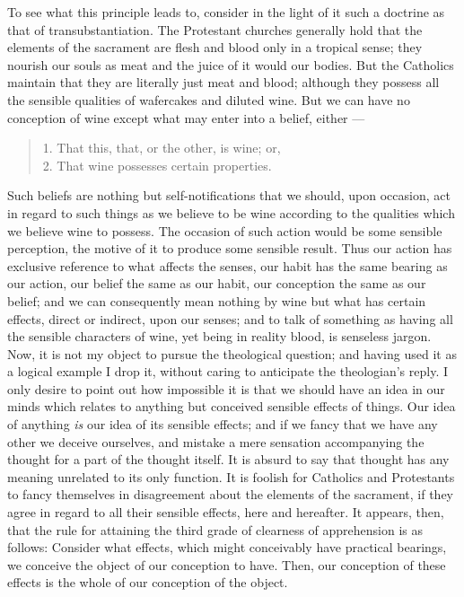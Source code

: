 To see what this principle leads to, consider in the light of it such a doctrine as that of transubstantiation. The Protestant churches generally hold that the elements of the sacrament are flesh and blood only in a tropical sense; they nourish our souls as meat and the juice of it would our bodies. But the Catholics maintain that they are literally just meat and blood; although they possess all the sensible qualities of wafercakes and diluted wine. But we can have no conception of wine except what may enter into a belief, either ---
\begin{quote}
1. That this, that, or the other, is wine; or,\\
2. That wine possesses certain properties.
\end{quote}

Such beliefs are nothing but self-notifications that we should, upon occasion, act in regard to such things as we believe to be wine according to the qualities which we believe wine to possess. The occasion  of such action would be some sensible perception, the motive of it to produce some sensible result. Thus our action has exclusive reference to what affects the senses, our habit has the same bearing as our action, our belief the same as our habit, our conception the same as our belief; and we can consequently mean nothing by wine but what has certain effects, direct or indirect, upon our senses; and to talk of something as having all the sensible characters of wine, yet being in reality blood, is senseless jargon. Now, it is not my object to pursue the theological question; and having used it as a logical example I drop it, without caring to anticipate the theologian's reply. I only desire to point out how impossible it is that we should have an idea in our minds which relates to anything but conceived sensible effects of things. Our idea of anything \emph{is} our idea of its sensible effects; and if we fancy that we have any other we deceive ourselves, and mistake a mere sensation accompanying the thought for a part of the thought itself. It is absurd to say that thought has any meaning unrelated to its only function. It is foolish for Catholics and Protestants to fancy themselves in disagreement about the elements of the sacrament, if they agree in regard to all their sensible effects, here and hereafter.
It appears, then, that the rule for attaining the third grade of clearness of apprehension is as follows: Consider what effects, which might conceivably have practical bearings, we conceive the object of our conception to have. Then, our conception of these effects is the whole of our conception of the object.


